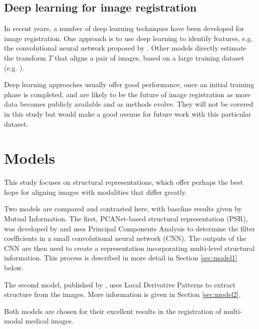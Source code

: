 \documentclass{report}
\begin{document}

\section{Deep learning for image registration}
In recent years, a number of deep learning techniques have been developed for image registration. One approach is to use deep learning to identify features, e.g. the convolutional neural network proposed by \cite{dosovitskiy2015discriminative}. Other models directly estimate the transform $T$ that aligns a pair of images, based on a large training dataset (e.g. \cite{detone2016deep}).

Deep learning approaches usually offer good performance, once an initial training phase is completed, and are likely to be the future of image registration as more data becomes publicly available and as methods evolve. They will not be covered in this study but would make a good avenue for future work with this particular dataset.

\chapter{Models}
\label{sec:models}
This study focuses on structural representations, which offer perhaps the best hope for aligning images with modalities that differ greatly. %

Two models are compared and contrasted here, with baseline results given by Mutual Information. The first, PCANet-based structural representation (PSR), was developed by \cite{zhu2018pcanet} and uses Principal Components Analysis to determine the filter coefficients in a small convolutional neural network (CNN). The outputs of the CNN are then used to create a representation incorporating multi-level structural information. This process is described in more detail in Section \ref{sec:model1} below.

The second model, published by \cite{jiang2017fast}, uses Local Derivative Patterns to extract structure from the images. More information is given in Section \ref{sec:model2}.

Both models are chosen for their excellent results in the registration of multi-modal medical images.
\end{document}
